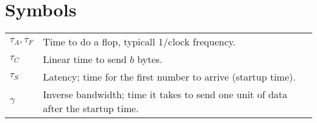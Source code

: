 
\section{Symbols} %
\label{sec:symbols}

\begin{center}
  \begin{tabular}{p{2cm}p{12cm}}
    \toprule
    $\tau_A, \tau_F$ & Time to do a flop, typicall 1/clock frequency. \\
    $\tau_C$         & Linear time to send $b$ bytes. \\
    $\tau_S$         & Latency; time for the first number to arrive (startup time). \\
    $\gamma$         & Inverse bandwidth; time it takes to send one unit of data after the startup time. \\
    \bottomrule
  \end{tabular}
\end{center}

